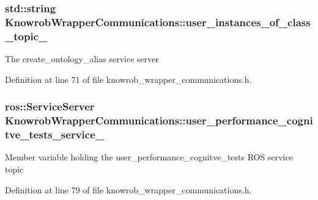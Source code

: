 \hypertarget{classKnowrobWrapperCommunications_aa6f2cc5d4d4dd17b22f490a89387dc35}{
\subsubsection[{user\-\_\-instances\-\_\-of\-\_\-class\-\_\-topic\-\_\-}]{\setlength{\rightskip}{0pt plus 5cm}std\-::string Knowrob\-Wrapper\-Communications\-::user\-\_\-instances\-\_\-of\-\_\-class\-\_\-topic\-\_\-\hspace{0.3cm}{\ttfamily [private]}}}\label{classKnowrobWrapperCommunications_aa6f2cc5d4d4dd17b22f490a89387dc35}
The create\-\_\-ontology\-\_\-alias service server 

Definition at line 71 of file knowrob\-\_\-wrapper\-\_\-communications.\-h.

\hypertarget{classKnowrobWrapperCommunications_acc4fabd8a1dd21309c01b03e4c5129e5}{
\subsubsection[{user\-\_\-performance\-\_\-cognitve\-\_\-tests\-\_\-service\-\_\-}]{\setlength{\rightskip}{0pt plus 5cm}ros\-::\-Service\-Server Knowrob\-Wrapper\-Communications\-::user\-\_\-performance\-\_\-cognitve\-\_\-tests\-\_\-service\-\_\-\hspace{0.3cm}{\ttfamily [private]}}}\label{classKnowrobWrapperCommunications_acc4fabd8a1dd21309c01b03e4c5129e5}
Member variable holding the user\-\_\-performance\-\_\-cognitve\-\_\-tests R\-O\-S service topic 

Definition at line 79 of file knowrob\-\_\-wrapper\-\_\-communications.\-h.

